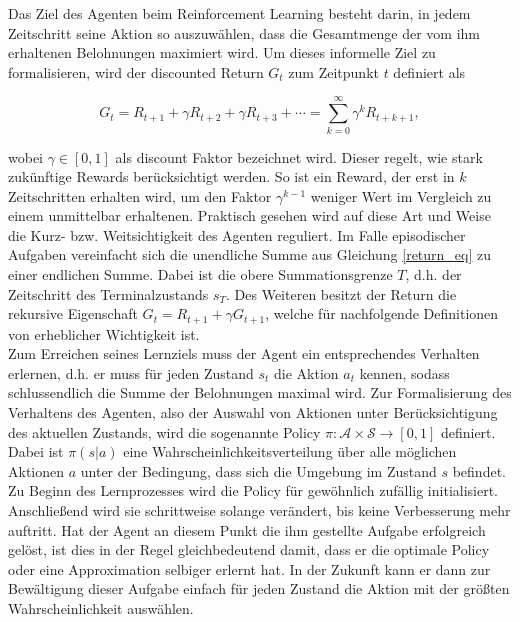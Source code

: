 Das Ziel des Agenten beim Reinforcement Learning besteht darin, in jedem Zeitschritt seine Aktion so auszuwählen, dass die Gesamtmenge der vom ihm erhaltenen Belohnungen maximiert wird. Um dieses informelle Ziel zu formalisieren, wird der discounted Return $G_t$ zum Zeitpunkt $t$ definiert als

\begin{equation}
  G_t = R_{t+1} + \gamma R_{t+2} + \gamma R_{t+3} + \dotsb = \sum_{k=0}^{\infty} \gamma^k R_{t+k+1},
  \label{return_eq}
\end{equation}

wobei $\gamma \in [0, 1]$ als discount Faktor bezeichnet wird. Dieser regelt, wie stark zukünftige Rewards berücksichtigt werden. So ist ein Reward, der erst in $k$ Zeitschritten erhalten wird, um den Faktor $\gamma^{k-1}$ weniger Wert im Vergleich zu einem unmittelbar erhaltenen. Praktisch gesehen wird auf diese Art und Weise die Kurz- bzw. Weitsichtigkeit des Agenten reguliert. Im Falle episodischer Aufgaben vereinfacht sich die unendliche Summe aus Gleichung \eqref{return_eq} zu einer endlichen Summe. Dabei ist die obere Summationsgrenze $T$, d.h. der Zeitschritt des Terminalzustands $s_T$. Des Weiteren besitzt der Return die rekursive Eigenschaft $G_t = R_{t+1} + \gamma G_{t+1}$, welche für nachfolgende Definitionen von erheblicher Wichtigkeit ist. \\

Zum Erreichen seines Lernziels muss der Agent ein entsprechendes Verhalten erlernen, d.h. er muss für jeden Zustand $s_t$ die Aktion $a_t$ kennen, sodass schlussendlich die Summe der Belohnungen maximal wird. Zur Formalisierung des Verhaltens des Agenten, also der Auswahl von Aktionen unter Berücksichtigung des aktuellen Zustands, wird die sogenannte Policy $\pi: \mathcal{A} \times \mathcal{S} \to [0, 1]$ definiert. Dabei ist $\pi(s|a)$ eine Wahrscheinlichkeitsverteilung über alle möglichen Aktionen $a$ unter der Bedingung, dass sich die Umgebung im Zustand $s$ befindet. Zu Beginn des Lernprozesses wird die Policy für gewöhnlich zufällig initialisiert. Anschließend wird sie schrittweise solange verändert, bis keine Verbesserung mehr auftritt. Hat der Agent an diesem Punkt die ihm gestellte Aufgabe erfolgreich gelöst, ist dies in der Regel gleichbedeutend damit, dass er die optimale Policy oder eine Approximation selbiger erlernt hat. In der Zukunft kann er dann zur Bewältigung dieser Aufgabe einfach für jeden Zustand die Aktion mit der größten Wahrscheinlichkeit auswählen. \\


